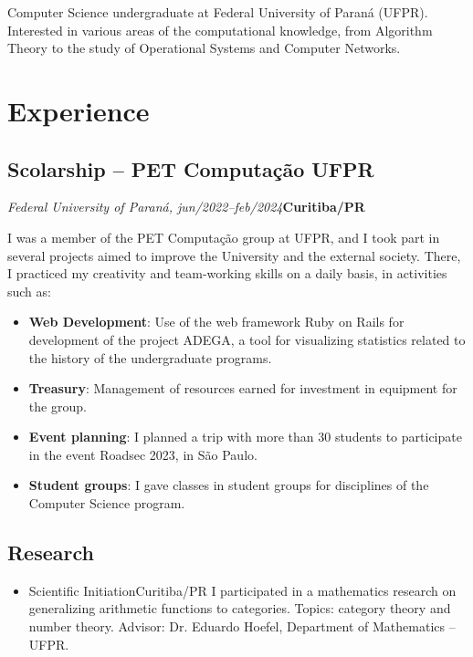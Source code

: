 \documentclass[a4paper, 12pt]{moderncv}
\begin{document}
\makecvtitle

\small{Computer Science undergraduate at Federal University of Paraná (UFPR).
Interested in various areas of the computational knowledge, from Algorithm
Theory to the study of Operational Systems and Computer Networks.}

\section{Experience}
\vspace{1pt}
\subsection{\small{Scolarship -- PET Computação UFPR}}
\textit{Federal University of Paraná, jun/2022--feb/2024}\hspace{185pt}\textbf{Curitiba/PR}

\vspace{3pt}
I was a member of the PET Computação group at UFPR, and I took part in several
projects aimed to improve the University and the external society. There, I
practiced my creativity and team-working skills on a daily basis, in activities
such as:
\vspace{4pt}
\begin{itemize}
    \item{\textbf{Web Development}: Use of the web framework Ruby on Rails for
          development of the project ADEGA, a tool for visualizing statistics
          related to the history of the undergraduate programs.}
    \item{\textbf{Treasury}: Management of resources earned for investment in
          equipment for the group.}
    \item{\textbf{Event planning}: I planned a trip with more than 30 students
          to participate in the event Roadsec 2023, in São Paulo.}
    \item{\textbf{Student groups}: I gave classes in student groups for
          disciplines of the Computer Science program.}
\end{itemize}

\vspace{4pt}
\subsection{\small{Research}}
\begin{itemize}
    \item{
        {Scientific Initiation}{Curitiba/PR}{}
        {I participated in a mathematics research on generalizing arithmetic functions
        to categories. Topics: category theory and number theory. Advisor: Dr. Eduardo
        Hoefel, Department of Mathematics -- UFPR.}}
\end{itemize}
\end{document}
